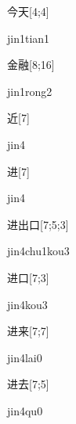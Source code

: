 \begin{verbete}{今天}[4;4]
\begin{pronuncia}{jin1tian1}
\end{pronuncia}
\end{verbete}

\begin{verbete}{金融}[8;16]
\begin{pronuncia}{jin1rong2}
\end{pronuncia}
\end{verbete}

\begin{verbete}[jin4]{近}[7]
\begin{pronuncia}{jin4}
\end{pronuncia}
\end{verbete}

\begin{verbete}[jin4]{进}[7]
\begin{pronuncia}{jin4}
\end{pronuncia}
\end{verbete}

\begin{verbete}{进出口}[7;5;3]
\begin{pronuncia}{jin4chu1kou3}
\end{pronuncia}
\end{verbete}

\begin{verbete}{进口}[7;3]
\begin{pronuncia}{jin4kou3}
\end{pronuncia}
\end{verbete}

\begin{verbete}{进来}[7;7]
\begin{pronuncia}{jin4lai0}
\end{pronuncia}
\end{verbete}

\begin{verbete}[jin4qu0]{进去}[7;5]
\begin{pronuncia}{jin4qu0}
\end{pronuncia}
\end{verbete}

